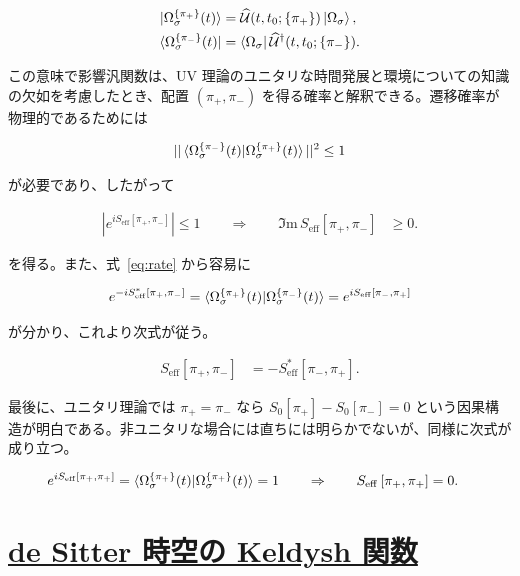 \documentclass[a4paper,11pt]{ltjsarticle}
\newcommand{\sectionlink}[1]{\section[#1]{\hyperlink{toc}{#1}}}
\numberwithin{equation}{section}
\newcommand{\ee}{e}
\newcommand{\Ima}{\Im \mathrm{m}\,}
\newcommand{\Eq}[1]{Eq.~(\ref{#1})}
\renewcommand{\Eq}[1]{式~\eqref{#1}}
\begin{document}
\begin{align}
   \ket{ \Omega^{ \{\pi_+ \} }_\sigma (t)} &=                \widehat{\mathcal{U}}(t,t_0;\{\pi_+\}) \ket{\Omega_\sigma}, \\
    \bra{ \Omega^{ \{\pi_- \} }_\sigma (t)}&= \bra{\Omega_\sigma}\widehat{\mathcal{U}}^\dag(t,t_0;\{\pi_-\}).
\end{align}

この意味で影響汎関数は、UV 理論のユニタリな時間発展と環境についての知識の欠如を考慮したとき、配置 $(\pi_+,\pi_-)$ を得る確率と解釈できる。遷移確率が物理的であるためには

\begin{align}
    ||\braket{\Omega^{ \{\pi_- \} }_\sigma (t) | \Omega^{ \{\pi_+ \} }_\sigma (t) } ||^2 \leq 1
\end{align}

が必要であり、したがって

\begin{align}
    |\ee^{i S_{\mathrm{eff}}\left[ \pi_+, \pi_-\right]}| \leq 1 \qquad \Rightarrow \qquad \Ima S_{\mathrm{eff}} \left[\pi_+,\pi_-\right] &\geq 0. 
\end{align}

を得る。また、\Eq{eq:rate} から容易に

\begin{align}
    \ee^{-i S^*_{\mathrm{eff}}\left[ \pi_+, \pi_-\right]} = \braket{\Omega^{ \{\pi_+ \} }_\sigma (t) | \Omega^{ \{\pi_- \} }_\sigma (t) } = \ee^{i S_{\mathrm{eff}}\left[ \pi_-, \pi_+\right]}
\end{align}

が分かり、これより次式が従う。

\begin{align}
    S_{\mathrm{eff}} \left[\pi_+,\pi_-\right] &= - 	S^*_{\mathrm{eff}} \left[\pi_-,\pi_+\right].
\end{align}

最後に、ユニタリ理論では $\pi_+=\pi_-$ なら $S_0[\pi_+]-S_0[\pi_-]=0$ という因果構造が明白である。非ユニタリな場合には直ちには明らかでないが、同様に次式が成り立つ。

\begin{align}
    \ee^{i S_{\mathrm{eff}}\left[ \pi_+, \pi_+\right]}  &= \braket{\Omega^{ \{\pi_+ \} }_\sigma (t) | \Omega^{ \{\pi_+ \} }_\sigma (t) }  =1 \qquad \Rightarrow \qquad S_{\mathrm{eff}}\left[ \pi_+, \pi_+\right] = 0.
\end{align}

\sectionlink{de Sitter 時空の Keldysh 関数}\label{app:dSKG}
\end{document}
